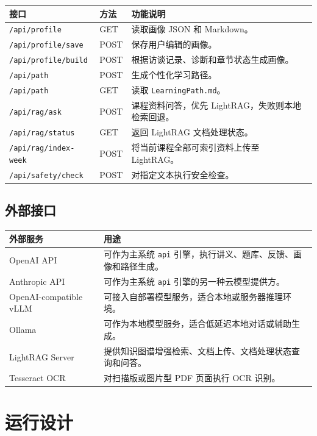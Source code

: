\documentclass[UTF8,fontset=windows,zihao=-4,openany]{ctexrep}
\begin{document}
\begin{longtable}{p{}p{}p{}}
\toprule
接口 & 方法 & 功能说明\\
\midrule
\texttt{/api/profile} & GET & 读取画像 JSON 和 Markdown。\\
\texttt{/api/profile/save} & POST & 保存用户编辑的画像。\\
\texttt{/api/profile/build} & POST & 根据访谈记录、诊断和章节状态生成画像。\\
\texttt{/api/path} & POST & 生成个性化学习路径。\\
\texttt{/api/path} & GET & 读取 \texttt{LearningPath.md}。\\
\texttt{/api/rag/ask} & POST & 课程资料问答，优先 LightRAG，失败则本地检索回退。\\
\texttt{/api/rag/status} & GET & 返回 LightRAG 文档处理状态。\\
\texttt{/api/rag/index-week} & POST & 将当前课程全部可索引资料上传至 LightRAG。\\
\texttt{/api/safety/check} & POST & 对指定文本执行安全检查。\\
\bottomrule
\end{longtable}

\section{外部接口}

\begin{longtable}{p{}p{}}
\toprule
外部服务 & 用途\\
\midrule
OpenAI API & 可作为主系统 \texttt{api} 引擎，执行讲义、题库、反馈、画像和路径生成。\\
Anthropic API & 可作为主系统 \texttt{api} 引擎的另一种云模型提供方。\\
OpenAI-compatible vLLM & 可接入自部署模型服务，适合本地或服务器推理环境。\\
Ollama & 可作为本地模型服务，适合低延迟本地对话或辅助生成。\\
LightRAG Server & 提供知识图谱增强检索、文档上传、文档处理状态查询和问答。\\
Tesseract OCR & 对扫描版或图片型 PDF 页面执行 OCR 识别。\\
\bottomrule
\end{longtable}

\chapter{运行设计}
\end{document}
